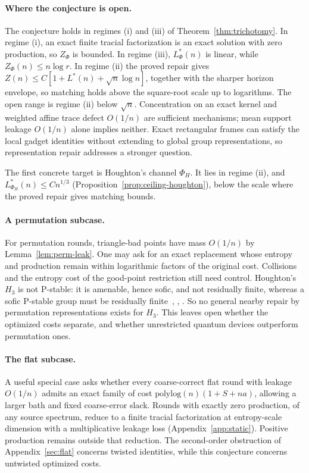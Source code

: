 \paragraph{Where the conjecture is open.}
The conjecture holds in regimes (i) and (iii) of
Theorem~\ref{thm:trichotomy}. In regime (i), an exact finite tracial
factorization is an exact solution with zero production, so $Z_\Phi$ is
bounded. In regime (iii), $L^*_\Phi(n)$ is linear, while
$Z_\Phi(n)\leq n\log r$. In regime (ii) the proved repair gives
$Z(n)\leq C[1+L^*(n)+\sqrt n\log n]$, together with the sharper
horizon envelope, so matching holds above the square-root scale up to
logarithms. The open range is regime (ii) below $\sqrt n$.
Concentration on an exact kernel and weighted affine trace defect
$O(1/n)$ are sufficient mechanisms; mean support leakage $O(1/n)$
alone implies neither. Exact rectangular frames can satisfy the local
gadget identities without extending to global group representations,
so representation repair addresses a stronger question.

The first concrete target is Houghton's channel $\Phi_H$. It lies in
regime (ii), and $L^*_{\Phi_H}(n)\leq Cn^{1/3}$
(Proposition~\ref{prop:ceiling-houghton}), below the scale where the
proved repair gives matching bounds.

\paragraph{A permutation subcase.}
For permutation rounds, triangle-bad points have mass
$O(1/n)$ by Lemma~\ref{lem:perm-leak}. One may ask for an exact
replacement whose entropy and production remain within
logarithmic factors of the original cost. Collisions and the
entropy cost of the good-point restriction still need control.
Houghton's $H_3$ is not P-stable: it is amenable, hence sofic,
and not residually finite, whereas a sofic P-stable group must
be residually finite~\cite{GlebskyRivera2009},
\cite[Theorem~7.2(ii)]{ArzhantsevaPaunescu2015},
\cite[discussion after Proposition~8.5]{BeckerLubotzkyThom2019}.
So no general nearby repair by permutation representations exists for
$H_3$. This leaves open whether the optimized costs separate, and
whether unrestricted quantum devices outperform permutation ones.

\paragraph{The flat subcase.}
A useful special case asks whether every coarse-correct flat round with
leakage $O(1/n)$ admits an exact family of cost
$\mathrm{polylog}(n)(1+S+na)$, allowing a larger bath and fixed
coarse-error slack. Rounds with exactly zero production, of any source
spectrum, reduce to a finite tracial factorization at entropy-scale
dimension with a multiplicative leakage loss (Appendix~\ref{app:static}).
Positive production remains outside that reduction. The second-order
obstruction of Appendix~\ref{sec:flat} concerns twisted identities,
while this conjecture concerns untwisted optimized costs.

